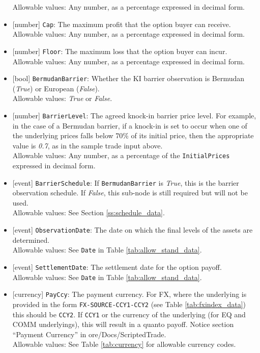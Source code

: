 \begin{itemize}
  Allowable values: Any number, as a percentage expressed in decimal form.
  \item{}[number] \lstinline!Cap!: The maximum profit that the option buyer can receive. \\
  Allowable values: Any number, as a percentage expressed in decimal form.
  \item{}[number] \lstinline!Floor!: The maximum loss that the option buyer can incur. \\
  Allowable values: Any number, as a percentage expressed in decimal form.
  \item{}[bool] \lstinline!BermudanBarrier!: Whether the KI barrier observation is Bermudan (\emph{True}) or European
  (\emph{False}). \\
  Allowable values: \emph{True} or \emph{False}.
  \item{}[number] \lstinline!BarrierLevel!: The agreed knock-in barrier price level. For example, in the case of a Bermudan barrier, if a knock-in is set to occur when one of the underlying prices falls below 70\% of its initial price, then the appropriate value is \emph{0.7}, as in the sample trade input above. \\
  Allowable values: Any number, as a percentage of the \lstinline!InitialPrices! expressed in decimal form.
  \item{}[event] \lstinline!BarrierSchedule!: If \lstinline!BermudanBarrier! is \emph{True}, this is the barrier observation
  schedule. If \emph{False}, this sub-node is still required but will not be used. \\
  Allowable values: See Section \ref{ss:schedule_data}.
  \item{}[event] \lstinline!ObservationDate!: The date on which the final levels of the assets are determined. \\
  Allowable values: See \lstinline!Date! in Table \ref{tab:allow_stand_data}.
  \item{}[event] \lstinline!SettlementDate!: The settlement date for the option payoff. \\
  Allowable values: See \lstinline!Date! in Table \ref{tab:allow_stand_data}.
  \item{}[currency] \lstinline!PayCcy!: The payment currency. For FX, where the underlying is provided
      in the form \lstinline!FX-SOURCE-CCY1-CCY2! (see Table \ref{tab:fxindex_data}) this should
      be \lstinline!CCY2!. If \lstinline!CCY1! or the currency of the underlying (for EQ and
      COMM underlyings), this will result in a quanto payoff. Notice section ``Payment Currency'' in ore/Docs/ScriptedTrade. \\
        Allowable values: See Table \ref{tab:currency} for allowable currency codes.
\end{itemize}

